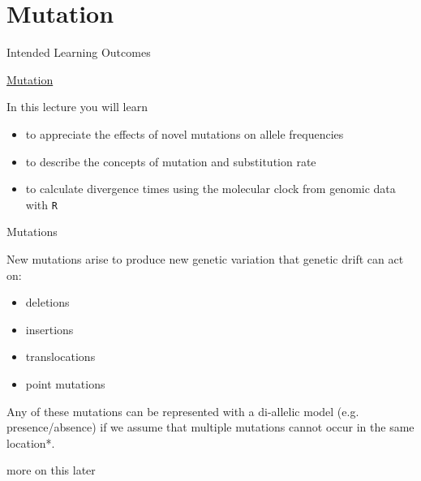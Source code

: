 
\section{Mutation}

\begin{frame}{Intended Learning Outcomes}

	\underline{Mutation}

	\bigskip

	In this lecture you will learn
  	\begin{itemize}
                \item to appreciate the effects of novel mutations on allele frequencies
                \item to describe the concepts of mutation and substitution rate
                \item to calculate divergence times using the molecular clock from genomic data with \texttt{R}
        \end{itemize}

\end{frame}

\begin{frame}{Mutations}

        New mutations arise to produce new genetic variation that genetic drift can act on:
        \begin{itemize}
                \item deletions
                \item insertions
                \item translocations
                \item point mutations
        \end{itemize}

        Any of these mutations can be represented with a di-allelic model (e.g. presence/absence)
        if we assume that multiple mutations cannot occur in the same location*.

	\bigskip
        \tiny * more on this later

\end{frame}


